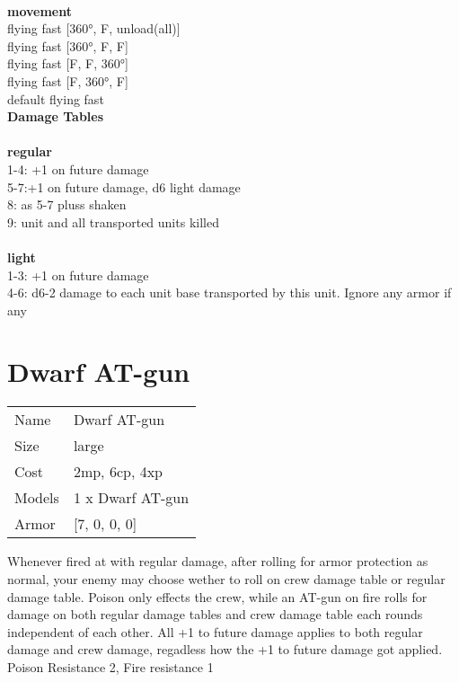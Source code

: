\ \\ {\bf movement } \\
flying fast [360°, F, unload(all)] \\
flying fast [360°, F, F] \\
flying fast [F, F, 360°] \\
flying fast [F, 360°, F] \\
default flying fast \\


{\bf Damage Tables} \\
\ \\ {\bf regular } \\
1-4: +1 on future damage \\
5-7:+1 on future damage, d6 light damage \\
8: as 5-7 pluss shaken \\
9: unit and all transported units killed \\
\ \\ {\bf light } \\
1-3: +1 on future damage \\
4-6: d6-2 damage to each unit base transported by this unit. Ignore any armor if any \\










\pagebreak\pagebreak

\section{ Dwarf AT-gun }

\begin{tabular}{ll}
  Name & Dwarf AT-gun \\
  Size & large\\
  Cost & 2mp, 6cp, 4xp\\
  Models & 1 x Dwarf AT-gun\\
  Armor & [7, 0, 0, 0]\\
\end{tabular}

\noindent Whenever fired at with regular damage, after rolling for armor protection as normal, your enemy may choose wether to roll on crew damage table or regular damage table. Poison only effects the crew, while an AT-gun on fire rolls for damage on both regular damage tables and crew damage table each rounds independent of each other. All +1 to future damage applies to both regular damage and crew damage, regadless how the +1 to future damage got applied.\\ 
 Poison Resistance 2, Fire resistance 1\\ 


